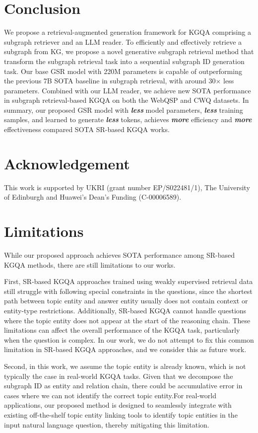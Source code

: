 \documentclass[11pt]{article}
\begin{document}
\section{Conclusion}
We propose a retrieval-augmented generation framework for KGQA comprising a subgraph retriever and an LLM reader.
 To efficiently and effectively retrieve a subgraph from KG, we propose a novel generative subgraph retrieval method that transform the subgraph retrieval task into a sequential subgraph ID generation task. Our base GSR model with 220M parameters is capable of outperforming the previous 7B SOTA baseline in subgraph retrieval, with around 30$\times$ less parameters. Combined with our LLM reader, we achieve new SOTA performance in subgraph retrieval-based KGQA on both the WebQSP and CWQ datasets. In summary, our proposed GSR model with \textbf{\emph{less}} model parameters, \textbf{\emph{less}} training samples, and learned to generate \textbf{\emph{less}} tokens, achieves \textbf{\emph{more}} efficiency and \textbf{\emph{more}} effectiveness compared SOTA SR-based KGQA works.

\section*{Acknowledgement}
This work is supported by UKRI (grant number EP/S022481/1),  The University of Edinburgh and  Huawei’s Dean’s Funding (C-00006589).

\section*{Limitations}
While our proposed approach achieves SOTA performance among SR-based KGQA methods, there are still limitations to our works. 

First, SR-based KGQA approaches trained using weakly supervised retrieval data still struggle with following special constraints in the questions, since the shortest path between topic entity and answer entity usually does not contain context or entity-type restrictions. Additionally, SR-based KGQA cannot handle questions where the topic entity does not appear at the start of the reasoning chain. These limitations can affect the overall performance of the KGQA task, particularly when the question is complex. In our work, we do not attempt to fix this common limitation in SR-based KGQA approaches, and we consider this as future work.

Second, in this work, we assume the topic entity is already known, which is not typically the case in real-world KGQA tasks. Given that we decompose the subgraph ID as entity and relation chain, there could be accumulative error in cases where we can not identify the correct topic entity.For real-world applications, our proposed method is designed to seamlessly integrate with existing off-the-shelf topic entity linking tools to identify topic entities in the input natural language question, thereby mitigating this limitation.
\end{document}
